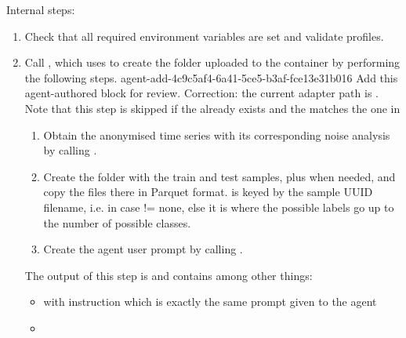 \documentclass[11pt]{article}
\begin{document}
Internal steps:
\begin{enumerate}
  \item Check that all required environment variables are set and validate profiles.
  \item Call , which uses  to create the folder uploaded to the container by performing the following steps.
  \agentProposedEdit
    {agent-add-4c9c5af4-6a41-5ce5-b3af-fce13e31b016}
    {Add this agent-authored block for review.}
    {}
    {Correction: the current adapter path is .}
  Note that this step is skipped if the  already exists and the  matches the one in 
  \begin{enumerate}
    \item Obtain the anonymised time series with its corresponding noise analysis by calling .
    \item Create the  folder with the train and test samples, plus  when needed, and copy the files there in Parquet format.
     is keyed by the sample UUID filename, i.e.  in case \termDescLevel != none, else it is  where the possible labels go up to the number of possible classes.
    \item Create the agent user prompt by calling .
  \end{enumerate}
  The output of this step is  and contains among other things:
  \begin{itemize}
    \item {} with instruction which is exactly the same prompt given to the agent
    \item {}
    \begin{DocCode}

\end{DocCode}
\end{itemize}
\end{enumerate}
\end{document}
